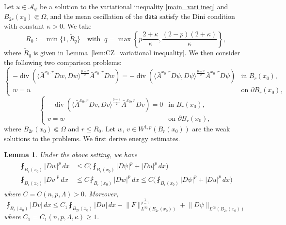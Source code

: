 \documentclass[reqno]{amsart}
\numberwithin{equation}{section}
\theoremstyle{plain}
\newtheorem{lemma}[theorem]{Lemma}
\theoremstyle{definition}
\theoremstyle{remark}
\DeclareMathOperator{\dv}{div}
\providecommand{\abs}[1]{\lvert#1\rvert}
\providecommand{\ip}[1]{\langle#1\rangle}
\providecommand{\norm}[1]{\lVert#1\rVert}
\begin{document}
Let $u\in \mathcal{A}_\psi$ be a solution to the variational inequality \eqref{main_vari ineq} and $B_{2r}(x_0)\Subset \Omega$, and the mean oscillation of the $\mathsf{data}$ satisfy the Dini condition with constant $\kappa>0$.
We take 
\begin{equation}\label{eq:R0}
R_0:=\min\{1,\tilde R_q\} \quad \text{with }\ q=\max\left\{p\frac{2+\kappa}{\kappa},\frac{(2-p)(2+\kappa)}{\kappa}\right\},
\end{equation}
where $\tilde R_q $ is given in Lemma~\ref{lem:CZ_variational inequality}.
We then consider the following two comparison problems:
\begin{equation} \label{eq0201sun1}
\begin{cases}
-\dv ( \ip{\bar{A}^{x_0,r}Dw, Dw }^{\frac{p-2}{2}} \bar{A}^{x_0,r} Dw)
=- \dv ( \ip{\bar{A}^{x_0,r} D\psi, D\psi }^{\frac{p-2}{2}} \bar{A}^{x_0,r} D\psi) 
& \text{in } B_r(x_0), \\
 w= u & \text{on } \partial B_r(x_0),
\end{cases}
\end{equation}
\begin{equation}\label{eq0201sun2}
\begin{cases}
-\dv ( \ip{\bar{A}^{x_0,r}Dv, Dv }^{\frac{p-2}{2}} \bar{A}^{x_0,r} Dv)
 =0
& \text{in } B_r(x_0), \\
 v= w & \text{on } \partial B_r(x_0),
\end{cases}
\end{equation}
where $B_{2r}(x_0)\Subset\Omega$ and $r\le R_0$.
Let $w$, $v\in W^{1,p}(B_r(x_0))$ are the weak solutions to the problems. We first derive energy estimates.
\begin{lemma}  
Under the above setting, we have
\begin{align} \label{eq0410fri3}
\begin{split}
\fint_{B_r(x_0)}\abs{Dw}^p \,dx &\leq C\bigg( \fint_{B_r(x_0)}  \abs{D\psi}^p+ \abs{Du}^p\, dx \bigg)\\
\fint_{B_r(x_0)}\abs{Dv}^p \,dx &\leq C\fint_{B_r(x_0)}\abs{Dw}^p \,dx \leq C\bigg( \fint_{B_r(x_0)}  \abs{D\psi}^p+ \abs{Du}^p\, dx \bigg)
\end{split}
\end{align}
where $C=C(n,p,\Lambda)>0$. Moreover, 
\begin{equation}\label{eq0410fri2}
 \fint_{B_r(x_0)}\abs{Dv}\,dx \leq C_1 \fint_{B_{2r}(x_0)} \abs{Du} \,dx+  \norm{F}_{L^\infty(B_{2r}(x_0))}^{\frac{1}{p-1}}+\norm{D\psi}_{L^\infty(B_{2r}(x_0))}    
\end{equation}
 where $C_1=C_1(n,p,\Lambda,\kappa)\geq 1$.

\end{lemma}
\end{document}
